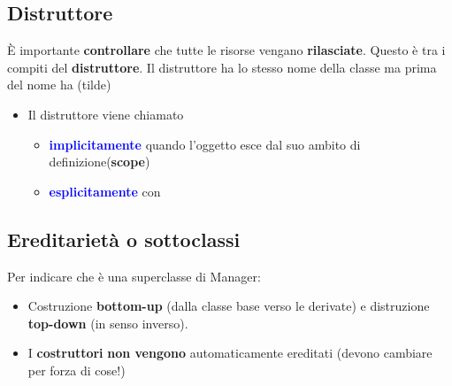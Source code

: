 \subsection{Distruttore}
È importante \textbf{controllare} che tutte le risorse vengano \textbf{rilasciate}. \newline Questo è tra i compiti del \textbf{distruttore}.\newline
Il distruttore ha lo stesso nome della classe ma prima del nome ha \textbf{\textcolor{blue}{\code{\~}}}(tilde)
\begin{itemize}
    \item  Il distruttore viene chiamato
    \begin{itemize}
        \item \textbf{\textcolor{blue}{implicitamente}} quando l’oggetto esce dal suo ambito di definizione(\textbf{scope})
        \item \textbf{\textcolor{blue}{esplicitamente}} con \textbf{}
    \end{itemize}
\end{itemize}
\begin{tcolorbox}[width=12cm, boxsep=10pt]
        
\end{tcolorbox}
\newpage
\subsection{Ereditarietà o sottoclassi}
Per indicare che  è una superclasse di Manager:

\begin{itemize}
    \item Costruzione \textbf{bottom-up} (dalla classe base verso le derivate) e distruzione \textbf{top-down} (in senso inverso).
    \item I \textbf{costruttori} \textbf{non vengono} automaticamente ereditati
    (devono cambiare per forza di cose!)
\end{itemize}

